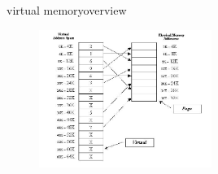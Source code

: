 \documentclass[10pt]{beamer}
\begin{document}
\begin{frame}{virtual memory}{overview}
  \begin{figure}[ht]
    \centering
    \includegraphics[width=0.5\textwidth, keepaspectratio=true]{images/virtual_memory.png}
  \end{figure}
\end{frame}

{\1
\begin{frame}
\end{frame}}
\end{document}
